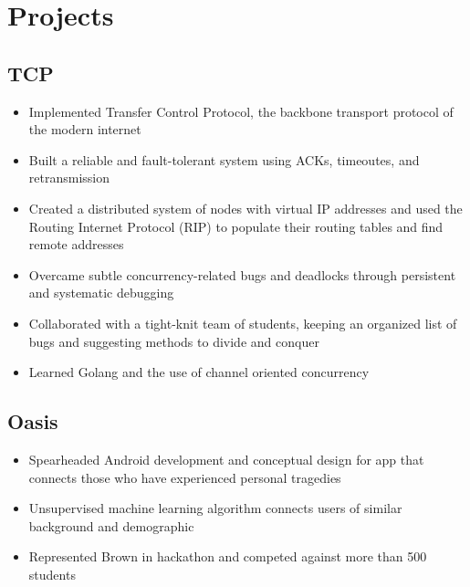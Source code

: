 \documentclass[11pt]{article}
\begin{document}

\section{Projects}

\subsection{TCP}
\begin{itemize}
	\item Implemented Transfer Control Protocol, the backbone transport protocol of the modern internet 
	\item Built a reliable and fault-tolerant system using ACKs, timeoutes, and retransmission
	\item Created a distributed system of nodes with virtual IP addresses and used the Routing Internet Protocol (RIP) to populate their routing tables and find remote addresses
	\item Overcame subtle concurrency-related bugs and deadlocks through persistent and systematic debugging 
	\item Collaborated with a tight-knit team of students, keeping an organized list of bugs and suggesting methods to divide and conquer
	\item Learned Golang and the use of channel oriented concurrency
\end{itemize}

\subsection{Oasis}
\begin{itemize}
	\item Spearheaded Android development and conceptual design for app that connects those who have
experienced personal tragedies
	\item Unsupervised machine learning algorithm connects users of similar background and demographic
	\item Represented Brown in hackathon and competed against more than 500 students
\end{itemize}
\end{document}
